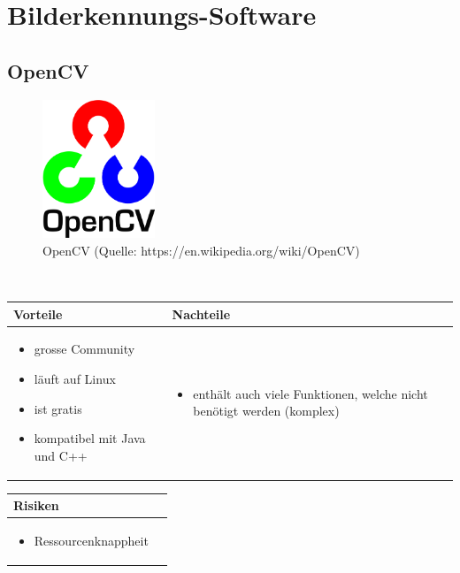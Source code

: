 
\section{Bilderkennungs-Software}


\subsection{OpenCV}

\begin{figure}[h!]%
\centering
\includegraphics[width=0.3\textwidth]{fig/opencv.png}
\caption{OpenCV (Quelle: https://en.wikipedia.org/wiki/OpenCV)}
\label{fig:OpenCV}
\end{figure}
\\
\begin{table}[h]
\begin{tabular}{p{} | p{}}



 \textbf{Vorteile} & \textbf{Nachteile} \\ \hline
	 
\begin{itemize}
\item grosse Community
\item läuft auf Linux
\item ist gratis
\item kompatibel mit Java und C++
\end{itemize}

 
 &
 
\begin{itemize}
\item enthält auch viele Funktionen, welche nicht benötigt werden (komplex)
\end{itemize}

\end{tabular}
\end{table}

\begin{table}[h]
\begin{tabular}{p{}p{}}


 \textbf{Risiken} & \\ \hline
	 
\begin{itemize}
\item Ressourcenknappheit
\end{itemize}

 
\end{tabular}
\end{table}

